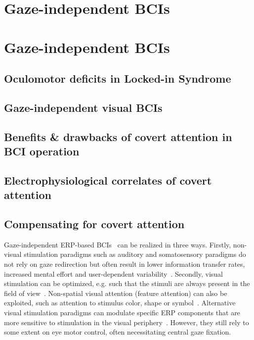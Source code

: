 \chapter{Gaze-independent BCIs}
\chapter{Gaze-independent BCIs}
\section{Oculomotor deficits in Locked-in Syndrome}
\section{Gaze-independent visual BCIs}
\section{Benefits \& drawbacks of covert attention in BCI operation}
\section{Electrophysiological correlates of covert attention}
\section{Compensating for covert attention}

Gaze-independent ERP-based BCIs~\cite{Riccio2012} can be realized in three
ways.
Firstly, non-visual stimulation paradigms such as auditory and somatosensory paradigms
do not rely on gaze redirection but often result in lower information transfer
rates, increased mental effort and user-dependent variability~\cite{Reichert2020b}.
Secondly, visual stimulation can be optimized, e.g. such that the stimuli are always
present in the field of view~\cite{Treder2010,Pires2011,Lees2018}.
Non-spatial visual attention (feature attention) can also be exploited, such as
attention to stimulus color, shape or symbol~\cite{Zhang2010,Treder2011,Hwang2015}.
Alternative visual stimulation paradigms can modulate specific ERP components
that are more sensitive to stimulation in the visual periphery~\cite{Schaeff2012,Xu2022}.
However, they still rely to some extent on
eye motor control, often necessitating central gaze fixation.

